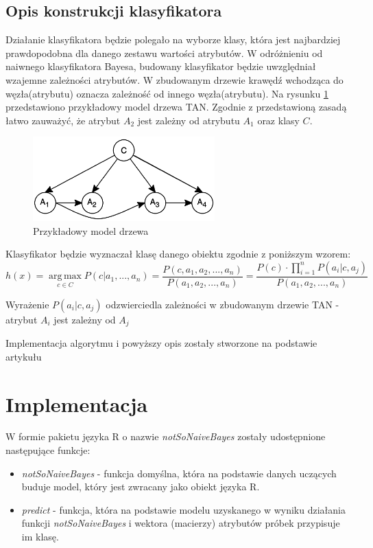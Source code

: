 \documentclass[paper=a4, fontsize=11pt]{scrartcl} %
\numberwithin{equation}{section} %
\numberwithin{figure}{section} %
\numberwithin{table}{section} %
\begin{document}
\subsection{Opis konstrukcji klasyfikatora}
Działanie klasyfikatora będzie polegało na wyborze klasy, która jest najbardziej prawdopodobna dla danego zestawu wartości atrybutów. W odróżnieniu od  naiwnego klasyfikatora Bayesa, budowany klasyfikator będzie uwzględniał wzajemne zależności atrybutów. W zbudowanym drzewie krawędź wchodząca do węzła(atrybutu) oznacza zależność od innego węzła(atrybutu). Na rysunku \ref{fig:model_drzewa_tan} przedstawiono przykładowy model drzewa TAN. Zgodnie z przedstawioną zasadą łatwo zauważyć, że atrybut $A_2$ jest zależny od atrybutu $A_1$ oraz klasy $C$.
\begin{figure}[h]
 \centering
 \includegraphics[width=70mm]{model1.png}
 \caption{Przykładowy model drzewa}
 \label{fig:model_drzewa_tan}
\end{figure}

Klasyfikator będzie wyznaczał klasę danego obiektu zgodnie z poniższym wzorem:
\[h(x) = \operatorname*{arg\,max}_{c \in C} P(c|a_1,...,a_n)= \frac{P(c,a_1,a_2,...,a_n)}{P(a_1,a_2,...,a_n)}= 
\frac {P(c) \cdot \prod_{i=1}^{n} {P(a_i|c,a_j)}}{P(a_1,a_2,...,a_n)} \]

Wyrażenie $P(a_i|c,a_j)$ odzwierciedla zależności w zbudowanym drzewie TAN - atrybut $A_i$ jest zależny od $A_j$

Implementacja algorytmu i powyższy opis zostały stworzone na podstawie artykułu \cite{Bayesian_Network_Classifiers}

\section{Implementacja}

W formie pakietu  języka R o nazwie \textit{notSoNaiveBayes} zostały udostępnione następujące funkcje:
\begin{itemize}
 \item \textit{notSoNaiveBayes} - funkcja domyślna, która na podstawie danych uczących buduje model, który jest zwracany jako obiekt języka R.
 \item \textit{predict} - funkcja, która na podstawie modelu uzyskanego w wyniku działania funkcji \textit{notSoNaiveBayes} i wektora (macierzy) atrybutów próbek przypisuje im klasę.
\end{itemize}
\end{document}
